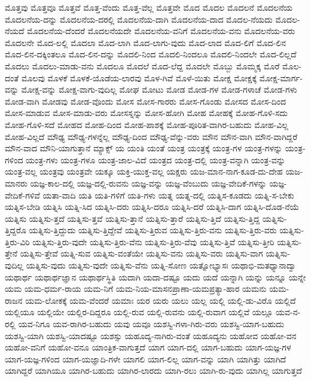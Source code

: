 {ಮೊತ್ತವು
ಮೊತ್ತವೂ
ಮೊತ್ತವೆ
ಮೊತ್ತ-ವೆಂದು
ಮೊತ್ತ-ವೆಲ್ಲ
ಮೊತ್ತವೇ
ಮೊದ
ಮೊದಲ
ಮೊದಲನೆ
ಮೊದಲನೆಯ
ಮೊದಲನೆಯ-ದನ್ನು
ಮೊದಲನೆಯ-ದರಲ್ಲಿ
ಮೊದಲನೆಯ-ದಾಗಿ
ಮೊದಲನೆಯ-ದಾದ
ಮೊದಲ-ನೆಯದು
ಮೊದಲ-ನೆಯದೆ
ಮೊದಲನೆಯ-ದೆಂದರೆ
ಮೊದಲನೆಯದೇ
ಮೊದಲನೆಯ-ವನಿಗೆ
ಮೊದಲನೆಯ-ವನು
ಮೊದಲನೆಯ-ವರು
ಮೊದಲನೇ
ಮೊದ-ಲಲ್ಲಿ
ಮೊದಲಾ
ಮೊದ-ಲಾಗಿ
ಮೊದ-ಲಾಗು-ವುದು
ಮೊದ-ಲಾದ
ಮೊದ-ಲಿಗೆ
ಮೊದ-ಲಿನ
ಮೊದ-ಲಿನ-ದಕ್ಕಿಂತಲೂ
ಮೊದ-ಲಿನ-ದನ್ನು
ಮೊದಲಿ-ನಿಂದ
ಮೊದಲಿ-ನಿಂದಲೂ
ಮೊದಲಿ-ನಿಂದಲೇ
ಮೊದ-ಲಿಲ್ಲದೆ
ಮೊದಲು
ಮೊದಲು-ಮಾಡು-ವನು
ಮೊದಲೂ
ಮೊದಲೆ
ಮೊದ-ಲೆದ್ದ
ಮೊದಲೇ
ಮೊಬ್ಬು
ಮೊಮ್ಮಕ್ಕ
ಮೊರೆ
ಮೊಲ-ದಂತೆ
ಮೊಲವು
ಮೊಳಕೆ
ಮೊಳಕೆ-ಯೊಡೆಯ-ಲಾರವು
ಮೊಳ-ಗಿವೆ
ಮೊಳೆ-ಯಿತು
ಮೋಕ್ಷ
ಮೋಕ್ಷಕ್ಕೆ
ಮೋಕ್ಷ-ಮಾರ್ಗ-ವನ್ನು
ಮೋಕ್ಷ-ವನ್ನು
ಮೋಕ್ಷ-ವಾಗು-ವುದಿಲ್ಲ
ಮೋಘ
ಮೋಟು
ಮೋಡ
ಮೋಡ-ಗಳ
ಮೋಡ-ಗಳಾಚೆ
ಮೋಡ-ಗಳು
ಮೋಡ-ವಾಗಿ
ಮೋಡವು
ಮೋಡ-ವೊಂದು
ಮೋಸ
ಮೋಸ-ಗಾರರು
ಮೋಸ-ಗೊಂಡು
ಮೋಸದ
ಮೋಸ-ದಿಂದ
ಮೋಸ-ಮಾಡುವ
ಮೋಸ-ಮಾಡು-ವರು
ಮೋಸಸ್ನನ್ನು
ಮೋಸ-ಹೋಗಿ
ಮೋಹ
ಮೋಹಕ್ಕೆ
ಮೋಹ-ಗೊಳಿ-ಸದು
ಮೋಹ-ಗೊಳಿ-ಸದೆ
ಮೋಹದ
ಮೋಹ-ದಿಂದ
ಮೋಹ-ಪಾಶಕ್ಕೆ
ಮೋಹ-ಪೂರಿತ-ವಾಗಿರ-ಬಹುದು
ಮೋಹ-ವಿಲ್ಲ
ಮೋಹ-ವಿಲ್ಲದೆ
ಮೌಢ್ಯ
ಮೌಢ್ಯ-ಗಳನ್ನೆಲ್ಲ
ಮೌಢ್ಯ-ದಿಂದ
ಮೌಢ್ಯ-ವೆನ್ನು-ವರು
ಮೌನ
ಮೌನ-ವಾಗಿ
ಮೌನ-ವಾಗಿದ್ದರೆ
ಮೌನ-ವಾದ
ಮೌನಿ-ಯಾಗುತ್ತಾನೆ
ಮ್ಯಾಕ್ಸ್
ಯ
ಯಂತಿ
ಯಂತೆ
ಯಂತ್ರ
ಯಂತ್ರಕ್ಕೆ
ಯಂತ್ರ-ಗಳ
ಯಂತ್ರ-ಗಳನ್ನು
ಯಂತ್ರ-ಗಳಿಂದ
ಯಂತ್ರ-ಗಳು
ಯಂತ್ರ-ಗಳೂ
ಯಂತ್ರ-ಜಾಲ-ವಿದೆ
ಯಂತ್ರದ
ಯಂತ್ರ-ದಲ್ಲಿ
ಯಂತ್ರ-ವನ್ನಾಗಿ
ಯಂತ್ರ-ವನ್ನು
ಯಂತ್ರ-ವಲ್ಲ
ಯಂತ್ರವು
ಯಂತ್ರವೇ
ಯಕ್ಕೂ
ಯಕ್ತಿ-ಯುಕ್ತ-ವಲ್ಲ
ಯಕ್ಷರು
ಯಜ-ಮಾನ-ನಾಗ-ಕೂಡ-ದು-ದೇಹ
ಯಜ-ಮಾನರು
ಯಜ್ಞ-ಕಾಲ-ದಲ್ಲಿ
ಯಜ್ಞ-ದಲ್ಲಿ-ರುವನು
ಯಜ್ಞ-ವನ್ನು
ಯಜ್ಞ-ವೆಂಬುದು
ಯಜ್ಞ-ವೇದಿಕೆ-ಗಳನ್ನು
ಯಜ್ಞ-ವೇದಿಕೆ-ಗಳಿವೆ
ಯತಾ-ವಾದಿ
ಯತಿ
ಯತಿ-ಗಳಿಗೆ
ಯತಿ-ಗಳು
ಯತ್ನ
ಯತ್ನ-ದಲ್ಲಿ
ಯತ್ನಿಸ-ಕೂಡದು
ಯತ್ನಿ-ಸ-ಬೇಕು
ಯತ್ನಿಸ-ಬೇಡಿ
ಯತ್ನಿಸಿ
ಯತ್ನಿ-ಸಿದ
ಯತ್ನಿಸಿ-ದರು
ಯತ್ನಿಸಿ-ದರೂ
ಯತ್ನಿಸಿ-ದರೆ
ಯತ್ನಿಸಿ-ದಾಗ
ಯತ್ನಿಸಿ-ದೊಡ-ನೆಯೆ
ಯತ್ನಿಸು
ಯತ್ನಿಸು-ತ್ತದೆ
ಯತ್ನಿಸು-ತ್ತವೆ
ಯತ್ನಿಸು-ತ್ತಾನೆ
ಯತ್ನಿಸು-ತ್ತಾರೆ
ಯತ್ನಿಸು-ತ್ತಿದೆ
ಯತ್ನಿಸು-ತ್ತಿದ್ದ
ಯತ್ನಿಸು-ತ್ತಿದ್ದರೊ
ಯತ್ನಿಸು-ತ್ತಿದ್ದುದು
ಯತ್ನಿಸು-ತ್ತಿದ್ದೇವೆ
ಯತ್ನಿಸು-ತ್ತಿರುವ
ಯತ್ನಿಸು-ತ್ತಿರು-ವನು
ಯತ್ನಿಸು-ತ್ತಿರು-ವರು
ಯತ್ನಿಸು-ತ್ತಿರು-ವಿರಿ
ಯತ್ನಿಸು-ತ್ತಿರು-ವುದೇ
ಯತ್ನಿಸು-ತ್ತಿರು-ವೆನು
ಯತ್ನಿಸು-ತ್ತಿರು-ವೆವು
ಯತ್ನಿಸು-ತ್ತಿವೆ
ಯತ್ನಿಸು-ತ್ತೀರಿ
ಯತ್ನಿಸು-ತ್ತೇನೆ
ಯತ್ನಿಸು-ತ್ತೇವೆ
ಯತ್ನಿ-ಸುವ
ಯತ್ನಿಸು-ವಂತೆಯೇ
ಯತ್ನಿಸು-ವನು
ಯತ್ನಿಸು-ವರು
ಯತ್ನಿಸು-ವಾಗ
ಯತ್ನಿಸು-ವುದಿಲ್ಲ
ಯತ್ನಿಸು-ವುದು
ಯತ್ನಿಸು-ವುದೇ
ಯತ್ನಿಸು-ವೆನು
ಯತ್ನಿ-ಸೋಣ
ಯತ್ನೋಭ್ಯಾಸಃ
ಯಥಾಭಿ-ಮತಧ್ಯಾನಾದ್ವಾ
ಯಥಾರ್ಥ
ಯಥಾರ್ಥಜ್ಞಾನ
ಯಥಾರ್ಥಸ್ಥಿತಿ
ಯದಾಗಿ
ಯದಾ-ದಷ್ಟೂ
ಯದು
ಯದೆ
ಯನ್ನಾಗಿ
ಯನ್ನು
ಯನ್ನೂ
ಯನ್ನೇ
ಯಮ
ಯಮ-ಧರ್ಮ-ರಾಯ
ಯಮ-ನಿಗೆ
ಯಮ-ನಿಯ-ಮಾಸನಪ್ರಾಣಾ-ಯಮಪ್ರತ್ಯಾ-ಹಾರ
ಯಮನು
ಯಮ-ರಾಜನ
ಯಮ-ಲೋಕಕ್ಕೆ
ಯಮ-ವೆಂದರೆ
ಯಮಾಃ
ಯರ
ಯರು
ಯಲು
ಯಲ್ಲ
ಯಲ್ಲಿ
ಯಲ್ಲಿ-ಡು-ವಿರೊ
ಯಲ್ಲಿದೆ
ಯಲ್ಲಿಯೂ
ಯಲ್ಲಿಯೇ
ಯಲ್ಲಿರ-ದಿದ್ದರೂ
ಯಲ್ಲಿ-ರುವ
ಯಲ್ಲಿ-ರುವನು
ಯಲ್ಲಿ-ರುವಾಗ
ಯಲ್ಲಿವೆ
ಯಲ್ಲೂ
ಯವ-ನ-ರಲ್ಲಿ
ಯವ-ನಿಗೂ
ಯವ-ರಾಗಿರ-ಬಹುದು
ಯವು
ಯವೂ
ಯಶಸ್ವಿ-ಗಳಾ-ಗಿರು-ವರು
ಯಶಸ್ವಿ-ಯಾಗ-ಬಹುದು
ಯಶಸ್ವಿ-ಯಾಗಿ
ಯಶಸ್ವಿ-ಯಾದಷ್ಟೂ
ಯಶಸ್ಸು
ಯಹೂದ್ಯ-ನಾಗಿರು-ವಂತೆ
ಯಹೂದ್ಯನು
ಯಹೋವ
ಯಹೋ-ವನ
ಯಹೋ-ವನಿಗೆ
ಯಹೋ-ವನೂ
ಯಾಂತ್ರಿಕ-ವಾಗುತ್ತದೆ
ಯಾಗ
ಯಾಗ-ದಲ್ಲಿ
ಯಾಗ-ಬಹುದು
ಯಾಗ-ಯಜ್ಞ-ಗಳ
ಯಾಗ-ಯಜ್ಞ-ಗಳಿಂದ
ಯಾಗ-ಯಜ್ಞಾದಿ-ಗಳೇ
ಯಾಗಲಿ
ಯಾಗ-ಲಿಲ್ಲ
ಯಾಗ-ವನ್ನು
ಯಾಗಿ
ಯಾಗಿತ್ತು
ಯಾಗಿದೆ
ಯಾಗಿದ್ದರೆ
ಯಾಗಿಯೂ
ಯಾಗಿರ-ಬಹುದು
ಯಾಗಿರ-ಲಾರದು
ಯಾಗಿ-ರಲು
ಯಾಗಿ-ರು-ವುದು
ಯಾಗಿಲ್ಲ
ಯಾಗುತ್ತದೆ
}
